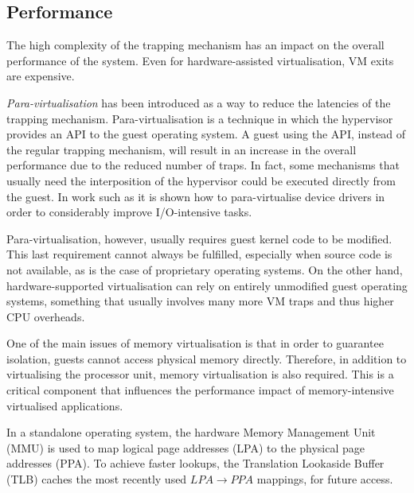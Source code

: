 \clearpage
\subsection{Performance}
The high complexity of the trapping mechanism has an impact on the overall performance of the system. Even for hardware-assisted virtualisation, VM exits are expensive. 
   
\emph{Para-virtualisation} has been introduced as a way to reduce the latencies of the trapping mechanism. Para-virtualisation is a technique in which the hypervisor provides an API to the guest operating system. A guest using the API, instead of the regular trapping mechanism, will result in an increase in the overall performance due to the reduced number of traps. In fact, some mechanisms that usually need the interposition of the hypervisor could be executed directly from the guest. In work such as \cite{virtio, HPC, xenart} it is shown how to para-virtualise device drivers in order to considerably improve I/O-intensive tasks.%
 
Para-virtualisation, however, usually requires guest kernel code to be modified. This last requirement cannot always be fulfilled, especially when source code is not available, as is the case of proprietary operating systems. On the other hand, hardware-supported virtualisation can rely on entirely unmodified guest operating systems, something that usually involves many more VM traps and thus higher CPU overheads.%

One of the main issues of memory virtualisation is that in order to guarantee isolation, guests cannot access physical memory directly. Therefore, in addition to virtualising the processor unit, memory virtualisation is also required. This is a critical component that influences the performance impact of memory-intensive virtualised applications. 

In a standalone operating system, the hardware Memory Management Unit (MMU) is used to map logical page addresses (LPA) to the physical page addresses (PPA). To achieve faster lookups, the Translation Lookaside Buffer (TLB) caches the most recently used $LPA \rightarrow PPA$ mappings, for future access.%


